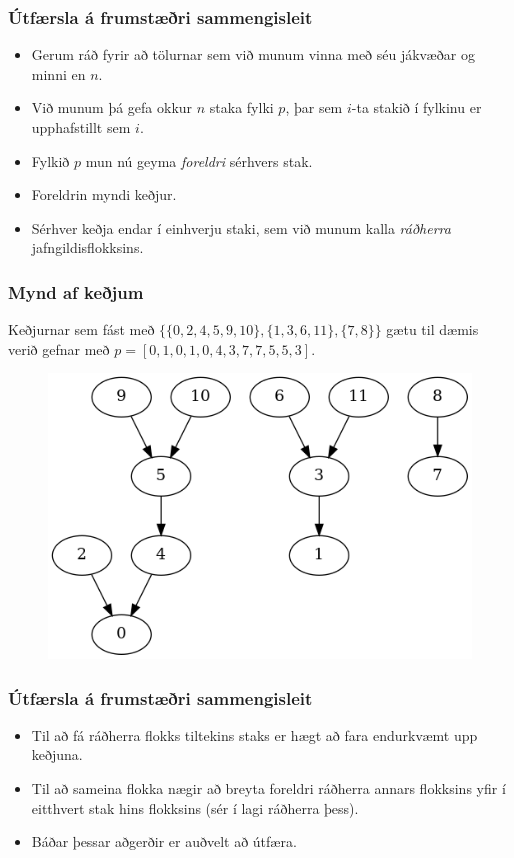 \documentclass[handout]{beamer}
\begin{document}
\begin{frame}
\frametitle{Útfærsla á frumstæðri sammengisleit}
\begin{itemize}
	\item<1-> Gerum ráð fyrir að tölurnar sem við munum vinna með séu jákvæðar og minni en $n$.
	\item<2-> Við munum þá gefa okkur $n$ staka fylki $p$, þar sem $i$-ta stakið í fylkinu er upphafstillt sem $i$.
	\item<3-> Fylkið $p$ mun nú geyma \emph{foreldri} sérhvers stak.
	\item<4-> Foreldrin myndi keðjur.
	\item<5-> Sérhver keðja endar í einhverju staki, sem við munum kalla \emph{ráðherra} jafngildisflokksins.
\end{itemize}
\end{frame}

\begin{frame}
\frametitle{Mynd af keðjum}
	Keðjurnar sem fást með $\{\{0, 2, 4, 5, 9, 10\}, \{1, 3, 6, 11\}, \{7, 8\}\}$ gætu til dæmis verið
	gefnar með $p = [0, 1, 0, 1, 0, 4, 3, 7, 7, 5, 5, 3]$.
	\begin{figure}
	\item<2->
		\includegraphics[scale=0.5]{mynd.png}
	\end{figure}
\end{frame}

\begin{frame}
\frametitle{Útfærsla á frumstæðri sammengisleit}
\begin{itemize}
	\item<1-> Til að fá ráðherra flokks tiltekins staks er hægt að fara endurkvæmt upp keðjuna.
	\item<2-> Til að sameina flokka nægir að breyta foreldri ráðherra annars flokksins yfir í
		eitthvert stak hins flokksins (sér í lagi ráðherra þess).
	\item<3-> Báðar þessar aðgerðir er auðvelt að útfæra.
\end{itemize}
\end{frame}
\end{document}
